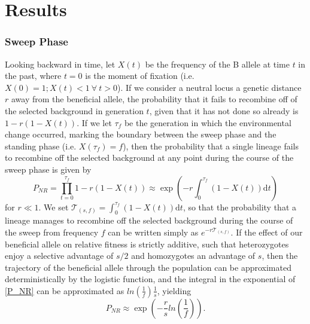 \documentclass[a4paper,10pt]{article}
\begin{document}
\section{Results}

\subsubsection*{Sweep Phase}

Looking backward in time, let $X\left(t\right)$ be the frequency of the B allele at time $t$ in the past, where $t=0$ is the moment of fixation (i.e. $X\left(0\right) = 1; X\left(t\right) < 1\ \forall\ t > 0$). If we consider a neutral locus a genetic distance $r$ away from the beneficial allele, the probability that it fails to recombine off of the selected background in generation $t$, given that it has not done so already is $1-r\left(1-X(t)\right)$. If we let $\tau_{f}$ be the generation in which the environmental change occurred, marking the boundary between the sweep phase and the standing phase (i.e. $X\left(\tau_{f}\right) = f$), then the probability that a single lineage fails to recombine off the selected background at any point during the course of the sweep phase is given by
\begin{equation}
P_{NR} = \prod_{t=0}^{\tau_{f}} 1-r\left(1-X(t)\right)  \approx \exp \left(-r \int_0^{\tau_{f}}(1-X\left(t\right))\mathrm{d} t \right) \label{P_NR}
\end{equation}
for $r \ll 1$. We set  $\mathcal{T}_{\left(s,f\right)} = \int_0^{\tau_{f}}(1-X\left(t\right))\mathrm{d}t$, so that the probability that a lineage manages to recombine off the selected background during the course of the sweep from frequency $f$ can be written simply as $e^{-r\mathcal{T}_{\left(s,f\right)}}$. If the effect of our beneficial allele on relative fitness is strictly additive, such that heterozygotes enjoy a selective advantage of $s/2$ and homozygotes an advantage of $s$, then the trajectory of the beneficial allele through the population can be approximated deterministically by the logistic function, and the integral in the exponential of \eqref{P_NR} can be approximated as $ln\left(\frac{1}{f}\right) \frac{1}{s}$, yielding
\begin{equation}
	P_{NR} \approx \exp \left(-\frac{r}{s}ln\left(\frac{1}{f}\right)\right).
\end{equation}
\end{document}

